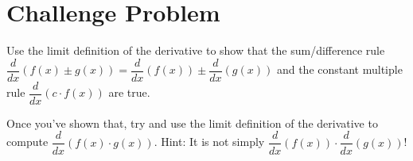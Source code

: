 \documentclass[12pt]{article}
\begin{document}
\section{Challenge Problem}

Use the limit definition of the derivative to show that the sum/difference rule $\dfrac{d}{dx}(f(x) \pm g(x)) = \dfrac{d}{dx}(f(x)) \pm \dfrac{d}{dx}(g(x))$
and the constant multiple rule $\dfrac{d}{dx} (c \cdot f(x))$ are true.

Once you've shown that, try and use the limit definition of the derivative to compute $\dfrac{d}{dx} (f(x) \cdot g(x))$. Hint: It is not simply $\dfrac{d}{dx} (f(x)) \cdot \dfrac{d}{dx} (g(x))$!


\end{document}
